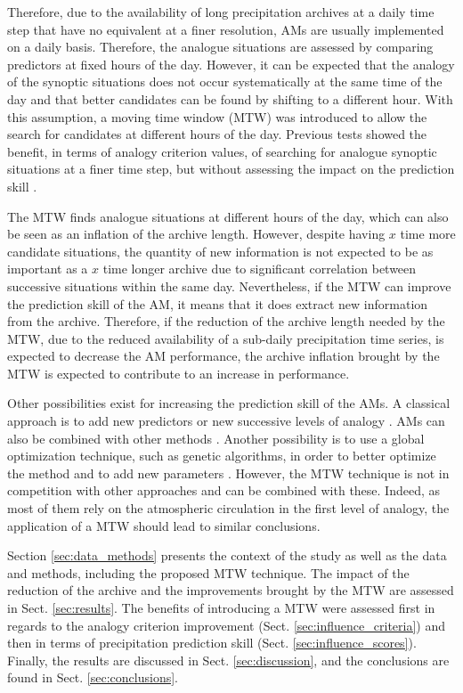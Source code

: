 \documentclass[hess, manuscript]{copernicus}
\begin{document}
	Therefore, due to the availability of long precipitation archives at a daily time step that have no equivalent at a finer resolution, AMs are usually implemented on a daily basis. Therefore, the analogue situations are assessed by comparing predictors at fixed hours of the day. However, it can be expected that the analogy of the synoptic situations does not occur systematically at the same time of the day and that better candidates can be found by shifting to a different hour. With this assumption, a moving time window (MTW) was introduced to allow the search for candidates at different hours of the day. Previous tests showed the benefit, in terms of analogy criterion values, of searching for analogue synoptic situations at a finer time step, but without assessing the impact on the prediction skill \citep{Finet2008}.
	
	The MTW finds analogue situations at different hours of the day, which can also be seen as an inflation of the archive length. However, despite having $x$ time more candidate situations, the quantity of new information is not expected to be as important as a $x$ time longer archive due to significant correlation between successive situations within the same day. Nevertheless, if the MTW can improve the prediction skill of the AM, it means that it does extract new information from the archive. Therefore, if the reduction of the archive length needed by the MTW, due to the reduced availability of a sub-daily precipitation time series, is expected to decrease the AM performance, the archive inflation brought by the MTW is expected to contribute to an increase in performance.
	
	Other possibilities exist for increasing the prediction skill of the AMs. A classical approach is to add new predictors or new successive levels of analogy \citep[see e.g.][]{Horton2012a, BenDaoud2016, Caillouet2016}. AMs can also be combined with other methods \citep[see e.g.][]{Chardon2014}. Another possibility is to use a global optimization technique, such as genetic algorithms, in order to better optimize the method and to add new parameters \citep{Horton2016}. However, the MTW technique is not in competition with other approaches and can be combined with these. Indeed, as most of them rely on the atmospheric circulation in the first level of analogy, the application of a MTW should lead to similar conclusions.
	
	Section \ref{sec:data_methods} presents the context of the study as well as the data and methods, including the proposed MTW technique. The impact of the reduction of the archive and the improvements brought by the MTW are assessed in Sect. \ref{sec:results}. The benefits of introducing a MTW were assessed first in regards to the analogy criterion improvement (Sect. \ref{sec:influence_criteria}) and then in terms of precipitation prediction skill (Sect. \ref{sec:influence_scores}). Finally, the results are discussed in Sect. \ref{sec:discussion}, and the conclusions are found in Sect. \ref{sec:conclusions}.
	
\end{document}

